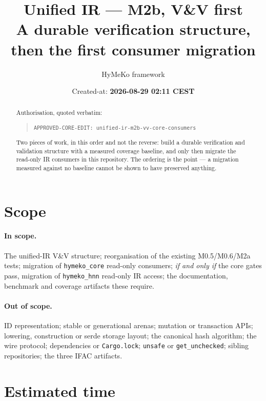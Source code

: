\documentclass[11pt,a4paper]{article}
\title{Unified IR --- M2b, V\&V first\\[2pt]
       \large A durable verification structure, then the first consumer migration}
\author{HyMeKo framework}
\date{Created-at: \textbf{2026-08-29 02:11 CEST}}
\newcommand{\code}[1]{\texttt{#1}}
\begin{document}
\maketitle

\begin{abstract}
\noindent
Authorisation, quoted verbatim:
\begin{quote}\code{APPROVED-CORE-EDIT: unified-ir-m2b-vv-core-consumers}\end{quote}

\noindent
Two pieces of work, in this order and not the reverse: build a durable
verification and validation structure with a measured coverage baseline, and
only then migrate the read-only IR consumers in this repository. The ordering is
the point --- a migration measured against no baseline cannot be shown to have
preserved anything.
\end{abstract}

\section{Scope}

\paragraph{In scope.} The unified-IR V\&V structure; reorganisation of the
existing M0.5/M0.6/M2a tests; migration of \code{hymeko\_core} read-only
consumers; \emph{if and only if} the core gates pass, migration of
\code{hymeko\_hnn} read-only IR access; the documentation, benchmark and
coverage artifacts these require.

\paragraph{Out of scope.} ID representation; stable or generational arenas;
mutation or transaction APIs; lowering, construction or serde storage layout;
the canonical hash algorithm; the wire protocol; dependencies or
\code{Cargo.lock}; \code{unsafe} or \code{get\_unchecked}; sibling repositories;
the three IFAC artifacts.

\section{Estimated time}
\end{document}
